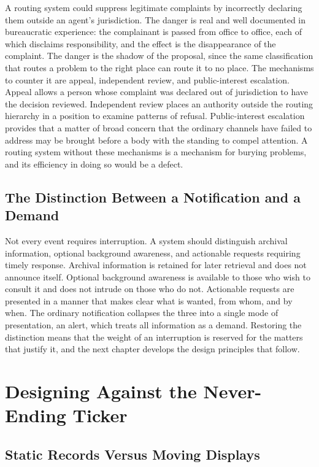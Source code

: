 \documentclass[11pt]{report}
\theoremstyle{definition}
\theoremstyle{remark}
\begin{document}
A routing system could suppress legitimate complaints by incorrectly declaring them outside an agent's jurisdiction. The danger is real and well documented in bureaucratic experience: the complainant is passed from office to office, each of which disclaims responsibility, and the effect is the disappearance of the complaint. The danger is the shadow of the proposal, since the same classification that routes a problem to the right place can route it to no place. The mechanisms to counter it are appeal, independent review, and public-interest escalation. Appeal allows a person whose complaint was declared out of jurisdiction to have the decision reviewed. Independent review places an authority outside the routing hierarchy in a position to examine patterns of refusal. Public-interest escalation provides that a matter of broad concern that the ordinary channels have failed to address may be brought before a body with the standing to compel attention. A routing system without these mechanisms is a mechanism for burying problems, and its efficiency in doing so would be a defect.

\section{The Distinction Between a Notification and a Demand}

Not every event requires interruption. A system should distinguish archival information, optional background awareness, and actionable requests requiring timely response. Archival information is retained for later retrieval and does not announce itself. Optional background awareness is available to those who wish to consult it and does not intrude on those who do not. Actionable requests are presented in a manner that makes clear what is wanted, from whom, and by when. The ordinary notification collapses the three into a single mode of presentation, an alert, which treats all information as a demand. Restoring the distinction means that the weight of an interruption is reserved for the matters that justify it, and the next chapter develops the design principles that follow.

\chapter{Designing Against the Never-Ending Ticker}

\section{Static Records Versus Moving Displays}
\end{document}
